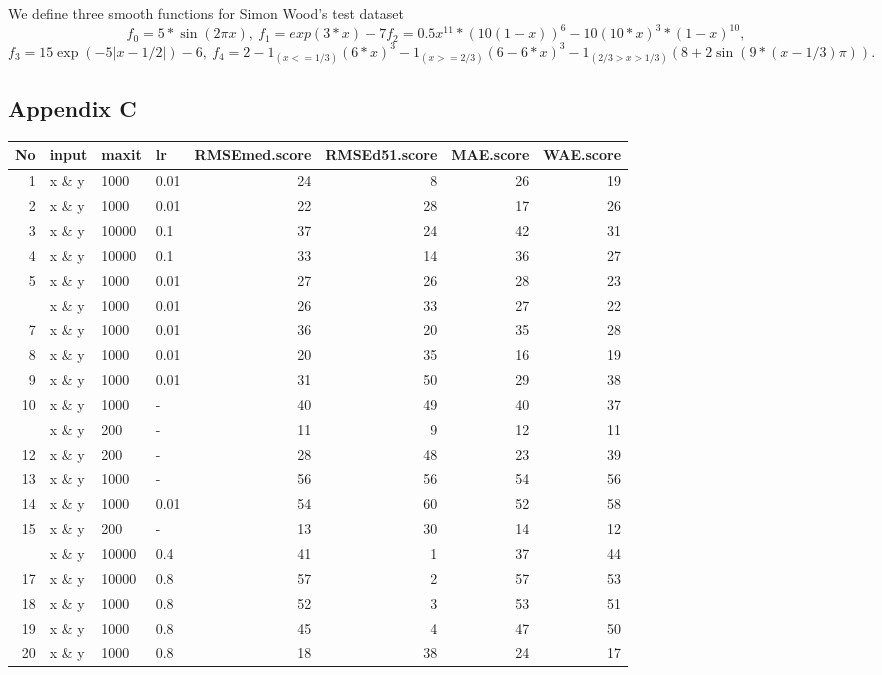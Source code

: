 We define three smooth functions for Simon Wood's test dataset \[
f_0=5*\sin(2\pi x),~
f_1=exp(3*x)-7
f_2=0.5 x^{11}*(10(1 - x))^6 - 10 (10*x)^3*(1 - x)^{10},~
\] \[
f_3=15 \exp(-5 |x-1/2|)-6,~
f_4=2-1_{(x <= 1/3)}(6*x)^3 - 1_{(x >= 2/3)} (6-6*x)^3 - 
1_{(2/3 > x > 1/3)}(8+2\sin(9*(x-1/3)\pi)).
\]

\hypertarget{appendix-c}{%
\subsection{Appendix C}\label{appendix-c}}

\begin{Schunk}

\begin{tabular}{rlllrrrr}
\toprule
No & input & maxit & lr & RMSEmed.score & RMSEd51.score & MAE.score & WAE.score\\
\midrule
1 & x \& y & 1000 & 0.01 & 24 & 8 & 26 & 19\\
2 & x \& y & 1000 & 0.01 & 22 & 28 & 17 & 26\\
3 & x \& y & 10000 & 0.1 & 37 & 24 & 42 & 31\\
4 & x \& y & 10000 & 0.1 & 33 & 14 & 36 & 27\\
5 & x \& y & 1000 & 0.01 & 27 & 26 & 28 & 23\\
\addlinespace
6 & x \& y & 1000 & 0.01 & 26 & 33 & 27 & 22\\
7 & x \& y & 1000 & 0.01 & 36 & 20 & 35 & 28\\
8 & x \& y & 1000 & 0.01 & 20 & 35 & 16 & 19\\
9 & x \& y & 1000 & 0.01 & 31 & 50 & 29 & 38\\
10 & x \& y & 1000 & - & 40 & 49 & 40 & 37\\
\addlinespace
11 & x \& y & 200 & - & 11 & 9 & 12 & 11\\
12 & x \& y & 200 & - & 28 & 48 & 23 & 39\\
13 & x \& y & 1000 & - & 56 & 56 & 54 & 56\\
14 & x \& y & 1000 & 0.01 & 54 & 60 & 52 & 58\\
15 & x \& y & 200 & - & 13 & 30 & 14 & 12\\
\addlinespace
16 & x \& y & 10000 & 0.4 & 41 & 1 & 37 & 44\\
17 & x \& y & 10000 & 0.8 & 57 & 2 & 57 & 53\\
18 & x \& y & 1000 & 0.8 & 52 & 3 & 53 & 51\\
19 & x \& y & 1000 & 0.8 & 45 & 4 & 47 & 50\\
20 & x \& y & 1000 & 0.8 & 18 & 38 & 24 & 17\\

\end{tabular}
\end{Schunk}
